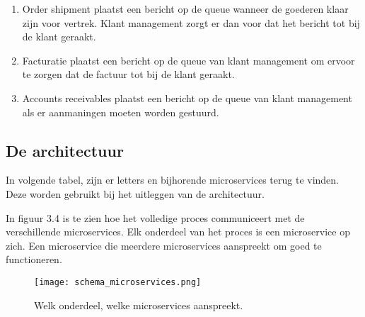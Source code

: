 \begin{enumerate}
	\item Order shipment plaatst een bericht op de queue wanneer de goederen klaar zijn voor vertrek. Klant management zorgt er dan voor dat het bericht tot bij de klant geraakt.
	\item Facturatie plaatst een bericht op de queue van klant management om ervoor te zorgen dat de factuur tot bij de klant geraakt.
	\item Accounts receivables plaatst een bericht op de queue van klant management als er aanmaningen moeten worden gestuurd.
\end{enumerate}

\subsection{De architectuur}
In volgende tabel, zijn er letters en bijhorende microservices terug te vinden. Deze worden gebruikt bij het uitleggen van de architectuur.
\begin{table}[]
	\caption{Legende die gebruikt wordt in de afbeeldingen.}
\end{table}

In figuur 3.4 is te zien hoe het volledige proces communiceert met de verschillende microservices. Elk onderdeel van het proces is een microservice op zich. Een microservice die meerdere microservices aanspreekt om goed te functioneren.
\begin{figure}[h]
	\texttt{[image: schema\_microservices.png]}
	\caption{Welk onderdeel, welke microservices aanspreekt.}
	\centering
\end{figure}

